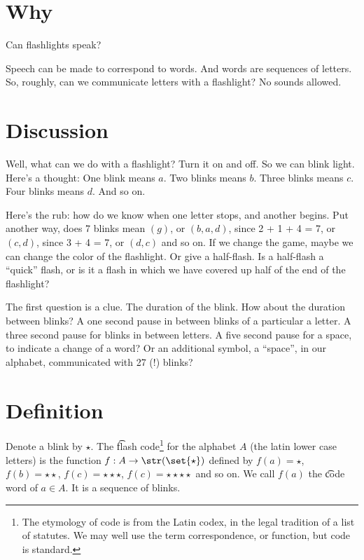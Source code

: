 
\section*{Why}

Can flashlights speak?

Speech can be made to correspond to words.
And words are sequences of letters.
So, roughly, can we communicate letters with a flashlight?
No sounds allowed.

\section*{Discussion}

Well, what can we do with a flashlight?
Turn it on and off.
So we can blink light.
Here's a thought:
One blink means $a$.
Two blinks means $b$.
Three blinks means $c$.
Four blinks means $d$.
And so on.

Here's the rub: how do we know when one letter stops, and another begins.
Put another way, does 7 blinks mean $(g)$, or $(b, a, d)$, since 2 + 1 + 4 = 7, or $(c, d)$, since 3 + 4 = 7, or $(d, c)$ and so on.
If we change the game, maybe we can change the color of the flashlight.
Or give a half-flash.
Is a half-flash a ``quick'' flash, or is it a flash in which we have covered up half of the end of the flashlight?

The first question is a clue.
The duration of the blink.
How about the duration between blinks?
A one second pause in between blinks of a particular a letter.
A three second pause for blinks in between letters.
A five second pause for a space, to indicate a change of a word?
Or an additional symbol, a ``space'', in our alphabet, communicated with 27 (!) blinks?

\newcommand{\blink}{\star}
\newcommand{\pause}{\square}
\section*{Definition}

Denote a blink by $\blink$.
The \t{flash code}\footnote{The etymology of code is from the Latin codex, in the legal tradition of a list of statutes. We may well use the term correspondence, or function, but code is standard.}
for the alphabet $A$ (the latin lower case letters) is the function $f: A \to \str(\set{\blink})$ defined by $f(a) = \blink$, $f(b) = \blink\blink$, $f(c) = \blink\blink\blink$, $f(c) = \blink\blink\blink\blink$ and so on.
We call $f(a)$ the \t{code word} of $a \in A$.
It is a sequence of blinks.

